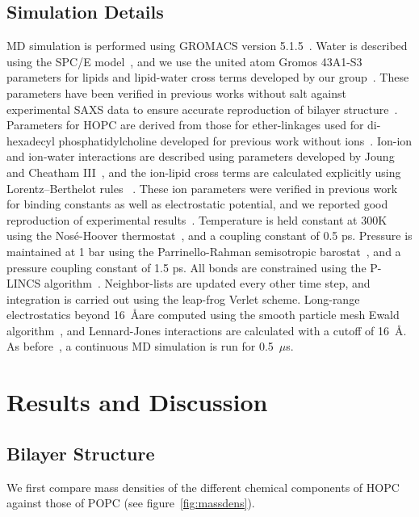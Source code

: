 \documentclass[12pt,openany,final]{book}
\begin{document}
\subsection{Simulation Details}
MD simulation is performed using GROMACS version 5.1.5~\cite{abraham:2015,pall:2014,van:2005,lindahl:2001,berendsen:1995}. Water is described using 
the SPC/E model~\cite{spce}, and we use the united atom Gromos 43A1-S3 parameters for lipids and 
lipid-water cross terms developed by our group~\cite{chiu:2009, kruczek:2017:ether}. 
These parameters have been verified in previous works without salt 
against experimental SAXS data
to ensure accurate reproduction of bilayer structure~\cite{kruczek:2017:ether}.
Parameters for HOPC are derived from those for ether-linkages used 
for di-hexadecyl phosphatidylcholine developed for previous work without ions~\cite{kruczek:2017:ether}.
Ion-ion and ion-water interactions are described using parameters developed by Joung and Cheatham III~\cite{joung:2008}, 
and the ion-lipid cross terms are calculated explicitly 
using Lorentz–Berthelot rules ~\cite{kruczek:2017}. These ion parameters
were verified in previous work for binding constants as well 
as electrostatic potential, and we reported good reproduction of experimental
results~\cite{kruczek:2017}. Temperature is held constant at 
300K using the Nos\'e-Hoover thermostat~\cite{nose:1983}, and a coupling constant of 0.5 ps. 
Pressure is maintained at 1 bar using the Parrinello-Rahman semisotropic barostat~\cite{parrinello:1981}, and 
a pressure coupling constant of 1.5 ps. 
All bonds are constrained using the P-LINCS algorithm~\cite{lincs}.
Neighbor-lists are updated every other time step, and integration is carried out using the leap-frog Verlet scheme. 
Long-range electrostatics beyond 16~\AA are computed using the smooth particle mesh Ewald algorithm~\cite{essmann:1995}, 
and Lennard-Jones interactions are calculated with a cutoff of 16~\AA.  
As before~\cite{kruczek:2017}, a continuous MD simulation is run for 0.5~$\mu$s. 

\section{Results and Discussion}

\subsection{Bilayer Structure}

We first compare mass densities of the different chemical components of HOPC against those 
of POPC (see figure~\ref{fig:massdens}).  
\end{document}
